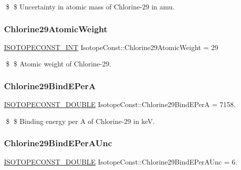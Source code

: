 \$ \$ Uncertainty in atomic mass of Chlorine-\/29 in amu. \mbox{\label{group___isotope_const-_chlorine-_cl29_gaa093fe8c1cbcd56105769a971ad6279e}} 
\subsubsection{\texorpdfstring{Chlorine29\+Atomic\+Weight}{Chlorine29AtomicWeight}}
{\footnotesize\ttfamily \mbox{\hyperlink{group___isotope_const-_macros_ga5f18360b3e99483a35c32d789e62621c}{I\+S\+O\+T\+O\+P\+E\+C\+O\+N\+S\+T\+\_\+\+I\+NT}} Isotope\+Const\+::\+Chlorine29\+Atomic\+Weight = 29}

\$ \$ Atomic weight of Chlorine-\/29. \mbox{\label{group___isotope_const-_chlorine-_cl29_gaa6039edf783ad7c16d1c7f807df5f2a2}} 
\subsubsection{\texorpdfstring{Chlorine29\+Bind\+E\+PerA}{Chlorine29BindEPerA}}
{\footnotesize\ttfamily \mbox{\hyperlink{group___isotope_const-_macros_ga8f45a7272ce02c0b4c65c44636ed719a}{I\+S\+O\+T\+O\+P\+E\+C\+O\+N\+S\+T\+\_\+\+D\+O\+U\+B\+LE}} Isotope\+Const\+::\+Chlorine29\+Bind\+E\+PerA = 7158.}

\$ \$ Binding energy per A of Chlorine-\/29 in keV. \mbox{\label{group___isotope_const-_chlorine-_cl29_ga704276675e717cefdac86e3fd49a442a}} 
\subsubsection{\texorpdfstring{Chlorine29\+Bind\+E\+Per\+A\+Unc}{Chlorine29BindEPerAUnc}}
{\footnotesize\ttfamily \mbox{\hyperlink{group___isotope_const-_macros_ga8f45a7272ce02c0b4c65c44636ed719a}{I\+S\+O\+T\+O\+P\+E\+C\+O\+N\+S\+T\+\_\+\+D\+O\+U\+B\+LE}} Isotope\+Const\+::\+Chlorine29\+Bind\+E\+Per\+A\+Unc = 6.}

